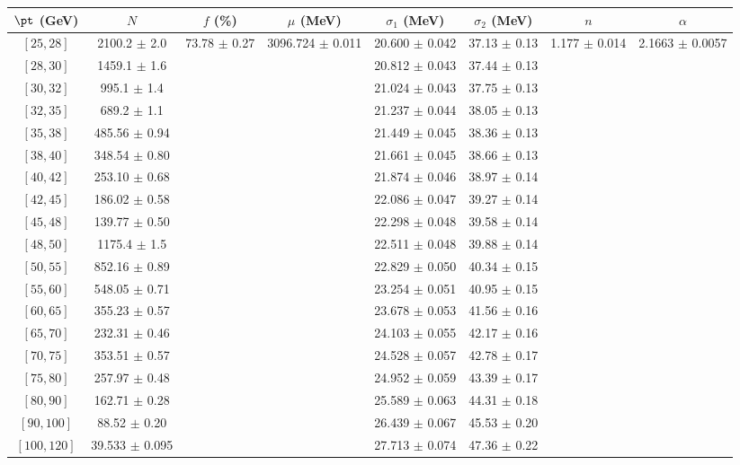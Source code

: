 \begin{tabular}{c||c|c|c|c|c|c|c}
$\pt$ (GeV) & $N$ & $f$ (\%) & $\mu$ (MeV) & $\sigma_1$ (MeV) & $\sigma_2$ (MeV) & $n$ & $\alpha$ \\
\hline
$[25, 28]$ & 2100.2 $\pm$ 2.0 & \multirow{19}{*}{73.78 $\pm$ 0.27} & \multirow{19}{*}{3096.724 $\pm$ 0.011} & 20.600 $\pm$ 0.042 & 37.13 $\pm$ 0.13 & \multirow{19}{*}{1.177 $\pm$ 0.014} & \multirow{19}{*}{2.1663 $\pm$ 0.0057}\\
$[28, 30]$ & 1459.1 $\pm$ 1.6 &  &  & 20.812 $\pm$ 0.043 & 37.44 $\pm$ 0.13 &  & \\
$[30, 32]$ & 995.1 $\pm$ 1.4 &  &  & 21.024 $\pm$ 0.043 & 37.75 $\pm$ 0.13 &  & \\
$[32, 35]$ & 689.2 $\pm$ 1.1 &  &  & 21.237 $\pm$ 0.044 & 38.05 $\pm$ 0.13 &  & \\
$[35, 38]$ & 485.56 $\pm$ 0.94 &  &  & 21.449 $\pm$ 0.045 & 38.36 $\pm$ 0.13 &  & \\
$[38, 40]$ & 348.54 $\pm$ 0.80 &  &  & 21.661 $\pm$ 0.045 & 38.66 $\pm$ 0.13 &  & \\
$[40, 42]$ & 253.10 $\pm$ 0.68 &  &  & 21.874 $\pm$ 0.046 & 38.97 $\pm$ 0.14 &  & \\
$[42, 45]$ & 186.02 $\pm$ 0.58 &  &  & 22.086 $\pm$ 0.047 & 39.27 $\pm$ 0.14 &  & \\
$[45, 48]$ & 139.77 $\pm$ 0.50 &  &  & 22.298 $\pm$ 0.048 & 39.58 $\pm$ 0.14 &  & \\
$[48, 50]$ & 1175.4 $\pm$ 1.5 &  &  & 22.511 $\pm$ 0.048 & 39.88 $\pm$ 0.14 &  & \\
$[50, 55]$ & 852.16 $\pm$ 0.89 &  &  & 22.829 $\pm$ 0.050 & 40.34 $\pm$ 0.15 &  & \\
$[55, 60]$ & 548.05 $\pm$ 0.71 &  &  & 23.254 $\pm$ 0.051 & 40.95 $\pm$ 0.15 &  & \\
$[60, 65]$ & 355.23 $\pm$ 0.57 &  &  & 23.678 $\pm$ 0.053 & 41.56 $\pm$ 0.16 &  & \\
$[65, 70]$ & 232.31 $\pm$ 0.46 &  &  & 24.103 $\pm$ 0.055 & 42.17 $\pm$ 0.16 &  & \\
$[70, 75]$ & 353.51 $\pm$ 0.57 &  &  & 24.528 $\pm$ 0.057 & 42.78 $\pm$ 0.17 &  & \\
$[75, 80]$ & 257.97 $\pm$ 0.48 &  &  & 24.952 $\pm$ 0.059 & 43.39 $\pm$ 0.17 &  & \\
$[80, 90]$ & 162.71 $\pm$ 0.28 &  &  & 25.589 $\pm$ 0.063 & 44.31 $\pm$ 0.18 &  & \\
$[90, 100]$ & 88.52 $\pm$ 0.20 &  &  & 26.439 $\pm$ 0.067 & 45.53 $\pm$ 0.20 &  & \\
$[100, 120]$ & 39.533 $\pm$ 0.095 &  &  & 27.713 $\pm$ 0.074 & 47.36 $\pm$ 0.22 &  & \\
\end{tabular}
